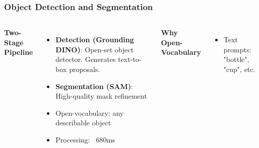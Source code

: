 \documentclass[serif, aspectratio=169, 9pt]{beamer}
\begin{document}
\begin{frame}
\frametitle{Object Detection and Segmentation}
    \begin{columns}
        \textbf{Two-Stage Pipeline}
        \begin{itemize}
            \item \textbf{Detection (Grounding DINO)}: Open-set object detector. Generates text-to-box proposals.
            \item \textbf{Segmentation (SAM)}: High-quality mask refinement
            \item Open-vocabulary: any describable object
            \item Processing: ~680ms
        \end{itemize}
        \vspace{0.3em}
        \textbf{Why Open-Vocabulary}
        \begin{itemize}
            \item Text prompts: "bottle", "cup", etc.

\end{itemize}
\end{columns}
\end{frame}
\end{document}
